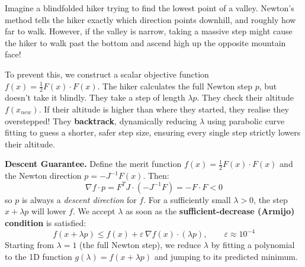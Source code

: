 \documentclass[12pt, a4paper]{article}
\begin{document}
\begin{tcolorbox}[colback=yellow!5!white,colframe=yellow!60!black,title=The Blind Hiker Analogy]
Imagine a blindfolded hiker trying to find the lowest point of a valley. Newton's method tells the hiker exactly which direction points downhill, and roughly how far to walk.
However, if the valley is narrow, taking a massive step might cause the hiker to walk past the bottom and ascend high up the opposite mountain face!

To prevent this, we construct a scalar objective function $f(x) = \frac{1}{2} F(x) \cdot F(x)$.
The hiker calculates the full Newton step $p$, but doesn't take it blindly. They take a step of length $\lambda p$. They check their altitude $f(x_{new})$. If their altitude is higher than where they started, they realise they overstepped! They \textbf{backtrack}, dynamically reducing $\lambda$ using parabolic curve fitting to guess a shorter, safer step size, ensuring every single step strictly lowers their altitude.
\end{tcolorbox}

\textbf{Descent Guarantee.} Define the merit function $f(x) = \tfrac{1}{2}F(x)\cdot F(x)$ and the Newton direction $p = -J^{-1}F(x)$. Then:
\begin{equation}
\nabla f \cdot p = F^T J \cdot (-J^{-1}F) = -F \cdot F < 0
\end{equation}
so $p$ is always a \textit{descent direction} for $f$. For a sufficiently small $\lambda > 0$, the step $x + \lambda p$ will lower $f$. We accept $\lambda$ as soon as the \textbf{sufficient-decrease (Armijo) condition} is satisfied:
\begin{equation}
f(x + \lambda p) \leq f(x) + \varepsilon\,\nabla f(x) \cdot (\lambda p), \qquad \varepsilon \approx 10^{-4}
\end{equation}
Starting from $\lambda = 1$ (the full Newton step), we reduce $\lambda$ by fitting a polynomial to the 1D function $g(\lambda) = f(x + \lambda p)$ and jumping to its predicted minimum.
\end{document}
